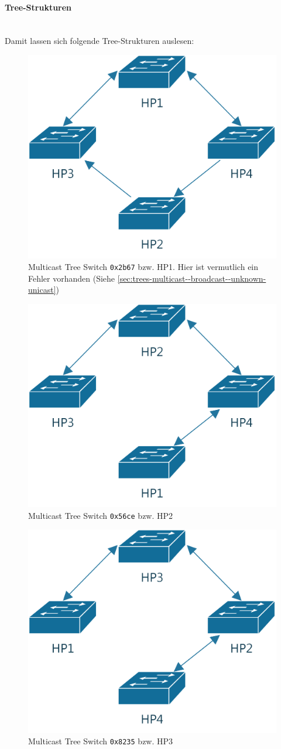 \paragraph{Tree-Strukturen} \hfill \\
Damit lassen sich folgende Tree-Strukturen auslesen:
\begin{figure}[H]
	\centering
	\includegraphics[width=0.5\linewidth]{images/multicast_trees/0x2b67}
	\caption{Multicast Tree Switch \lstinline|0x2b67| bzw. HP1. Hier ist vermutlich ein Fehler vorhanden (Siehe \ref{sec:trees-multicast--broadcast--unknown-unicast})}
	\label{fig:multicasttree0x2b67}
\end{figure}

\begin{figure}[H]
	\centering
	\includegraphics[width=0.5\linewidth]{images/multicast_trees/0x56ce}
	\caption{Multicast Tree Switch \lstinline|0x56ce| bzw. HP2}
	\label{fig:multicasttree0x56ce}
\end{figure}

\begin{figure}[H]
	\centering
	\includegraphics[width=0.5\linewidth]{images/multicast_trees/0x8235}
	\caption{Multicast Tree Switch \lstinline|0x8235| bzw. HP3}
	\label{fig:multicasttree0x8235s}
\end{figure}

